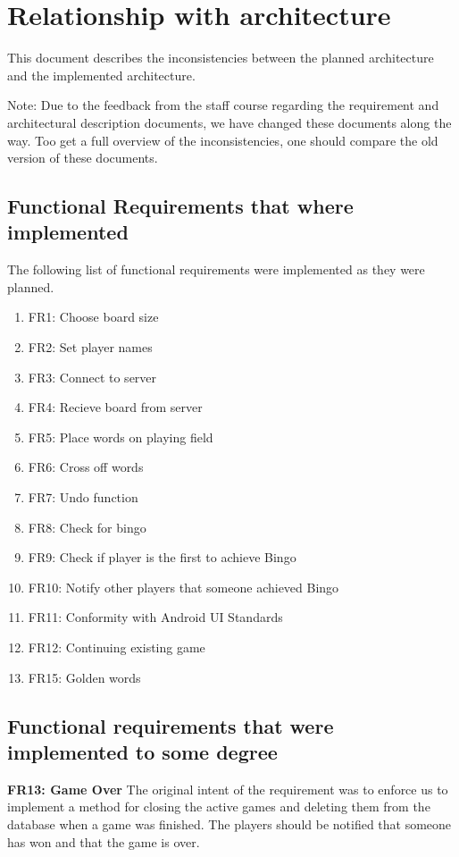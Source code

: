 \section{Relationship with architecture}
\label{relationshipwitharchitecture}

This document describes the inconsistencies between the planned architecture and the implemented architecture. 

Note: Due to the feedback from the staff course regarding the requirement and architectural description documents, we have changed these documents along the way. Too get a full overview of the inconsistencies, one should compare the old version of these documents.

\subsection{Functional Requirements that where implemented}

The following list of functional requirements were implemented as they were planned. 

\begin{enumerate}
	\item{FR1: Choose board size}
	\item{FR2: Set player names}
	\item{FR3: Connect to server}
	\item{FR4: Recieve board from server}
	\item{FR5: Place words on playing field}
	\item{FR6: Cross off words}
	\item{FR7: Undo function}
	\item{FR8: Check for bingo}
	\item{FR9: Check if player is the first to achieve Bingo}
	\item{FR10: Notify other players that someone achieved Bingo}
	\item{FR11: Conformity with Android UI Standards}
	\item{FR12: Continuing existing game}
	\item{FR15: Golden words}
\end{enumerate}


\subsection{Functional requirements that were implemented to some degree}

\textbf{FR13: Game Over}
The original intent of the requirement was to enforce us to implement a method for closing the active games and deleting them from the database when a game was finished. The players should be notified that someone has won and that the game is over.

